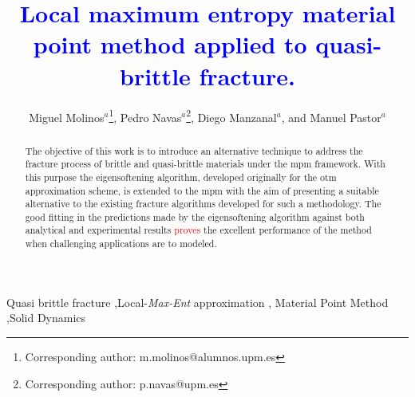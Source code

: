 \documentclass[preprint,12pt,a4paper]{elsarticle}
\begin{document}
\begin{frontmatter}


\title{\textcolor{blue}{Local maximum entropy material point method applied to quasi-brittle fracture.} }



\author{
Miguel Molinos$^a$\footnote{Corresponding author: m.molinos@alumnos.upm.es},
Pedro Navas$^a$\footnote{Corresponding author: p.navas@upm.es},
Diego Manzanal$^a$,
and Manuel Pastor$^a$
 }
 \address{
 $^a$ ETSI Caminos, Canales y Puertos, Universidad Polit\'ectnica de Madrid.\\
 c. Prof. Aranguren 3, 28040 Madrid, Spain
}

\begin{abstract}
  The objective of this work is to introduce an alternative
  technique to address the fracture process of brittle and
  quasi-brittle materials under the \acrfull{mpm} 
  framework. With this purpose the eigensoftening algorithm, developed
  originally for the \acrfull{otm} approximation scheme, is extended
  to the \acrshort{mpm} with the aim of presenting a suitable alternative
  to the existing fracture algorithms developed for such a methodology.  The good fitting in the predictions made by
   the eigensoftening algorithm against both analytical and experimental
  results \textcolor{red}{proves} the excellent performance of the method when challenging
  applications are to modeled.
\end{abstract}

\begin{keyword}
Quasi brittle fracture \sep Local-\textit{Max-Ent} approximation \sep
Material Point Method \sep Solid Dynamics
\end{keyword}

\end{frontmatter}

\linenumbers

\printglossary[type=\acronymtype]

\end{document}
